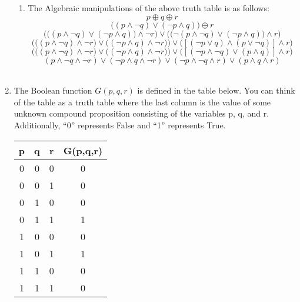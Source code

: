 \documentclass[12pt]{article}
\begin{document}
\begin{enumerate}
\begin{enumerate}
            \item The Algebraic manipulations of the above truth table is as follows: \\
                \[p \oplus q \oplus r \]
                \[\big( (p \wedge \neg q) \vee (\neg p \wedge q) \big) \oplus r \]
                \[\Big( \big( (p \wedge \neg q) \vee (\neg p \wedge q) \big) \wedge \neg r \Big) \vee  \Big( \big( \neg (p \wedge \neg q) \vee (\neg p \wedge q) \big) \wedge r \Big)\]
                \[\Big( \big( (p \wedge \neg q) \wedge \neg r \big) \vee  \big( (\neg p \wedge q) \wedge \neg r \big) \Big) \vee \Big( [(\neg p \vee q) \wedge (p \vee \neg q) ] \wedge r \Big) \]
                \[\Big( \big( (p \wedge \neg q) \wedge \neg r \big) \vee  \big( (\neg p \wedge q) \wedge \neg r \big) \Big) \vee \Big( [(\neg p \wedge \neg q) \vee (p \wedge  q) ] \wedge  r \Big) \]
                \[ (p \wedge \neg q \wedge \neg r) \vee  (\neg p \wedge q \wedge \neg r) \vee (\neg p \wedge \neg q \wedge r) \vee (p \wedge  q \wedge  r) \] \\
        \end{enumerate}


    \item The Boolean function $G(p,q,r)$ is defined in the table below. You can think of the table as a truth table where the last column is the value of some unknown compound proposition consisting of the variables p, q, and r. Additionally, ``0'' represents False and ``1'' represents True. 

        \begin{table}[h]
            \centering

            \begin{tabular}{| c c c | c |}
                \hline
                p & q & r & G(p,q,r) \\ \hline
                0 & 0 & 0 & 0 \\ 
                0 & 0 & 1 & 0 \\ 
                0 & 1 & 0 & 0 \\ 
                0 & 1 & 1 & 1 \\ 
                1 & 0 & 0 & 0 \\ 
                1 & 0 & 1 & 1 \\ 
                1 & 1 & 0 & 0 \\ 
                1 & 1 & 1 & 0 \\ \hline

            \end{tabular}


\end{table}
\end{enumerate}
\end{document}
